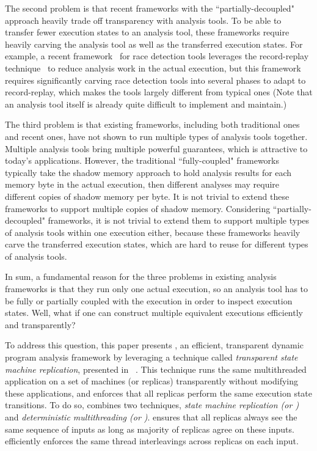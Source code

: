 The second problem is that recent frameworks with the ``partially-decoupled"
approach heavily trade off transparency with analysis tools. To be able to
transfer fewer execution states to an analysis tool, these frameworks require
heavily carving the analysis tool as well as the transferred execution states.
For example, a recent framework~\cite{wester:parallelizing:asplos13} for race
detection tools leverages the record-replay
technique~\cite{scribe:sigmetrics2010, respec:asplos10, racepro:sosp11} to
reduce analysis work in the actual execution, but this framework
requires significantly carving race detection tools into several phases to adapt
to record-replay, which makes the tools largely different from typical ones
(Note that an analysis tool itself is already quite difficult to implement and
maintain.)


The third problem is that existing frameworks, including both traditional ones
and recent ones, have not shown to run multiple types of analysis tools 
together. Multiple analysis tools bring multiple powerful
guarantees, which is attractive to today's applications. However, the
traditional ``fully-coupled" frameworks typically take the shadow memory 
approach to hold analysis results for each memory byte in the actual execution, 
then different analyses may require different copies of shadow memory per byte. 
It is not trivial to extend these frameworks to support multiple copies of 
shadow memory. Considering ``partially-decoupled" frameworks, it is not trivial 
to extend them to support multiple types of analysis tools within one execution 
either, because these frameworks heavily carve the transferred execution states, 
which are hard to reuse for different types of analysis tools.


In sum, a fundamental reason for the three problems in existing analysis 
frameworks is that they run only one actual execution, so an analysis tool has
to be fully or partially coupled with the execution in order to inspect
execution states. Well, what if one can construct multiple equivalent
executions efficiently and transparently?




To address this question, this paper presents \xxx, an efficient, 
transparent dynamic program analysis framework by leveraging a technique called 
\emph{transparent state machine replication}, presented in 
\repbox~\cite{repbox:sosp15}. This technique runs the same multithreaded 
application on a set of machines (or replicas) transparently without modifying 
these applications, and enforces that all replicas
perform the same execution state transitions. To do so, \repbox combines two techniques, 
 \emph{state machine replication (or 
\smr)} and \emph{deterministic multithreading (or \dmt)}.  \smr ensures that all replicas
always see the same sequence of inputs as long as majority of replicas agree on these inputs. 
 \dmt efficiently enforces the same thread interleavings across replicas on each input.


